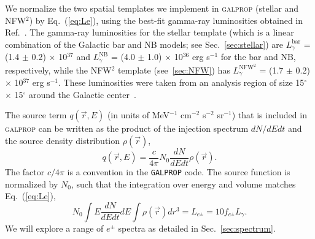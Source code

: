\documentclass[doublespace,nopageskip]{VTthesis} %
\begin{document}
We normalize the two spatial templates we implement in \textsc{galprop} (stellar and NFW$^2$) by Eq.~(\ref{eq:Le}), using the best-fit gamma-ray luminosities obtained in Ref.~\cite{2018NatAs...2..387M}. The gamma-ray luminosities for the stellar template (which is a linear combination of the Galactic bar and NB models; see Sec.~\ref{sec:stellar}) are $L^{\text{bar}}_\gamma$ = (1.4 $\pm$ 0.2) $\times$ 10$^{37}$ and $L^{\text{NB}}_\gamma$ = (4.0 $\pm$ 1.0) $\times$ 10$^{36}$ erg s$^{-1}$ for the bar and NB, respectively, while the NFW$^2$ template (see~\ref{sec:NFW}) has $L^{\text{NFW}^2}_\gamma$ = (1.7 $\pm$ 0.2) $\times$ 10$^{37}$ erg s$^{-1}$. These luminosities were taken from an analysis region of size 15$^\circ$ $\times$ 15$^\circ$ around the Galactic center~\cite{2018NatAs...2..387M}.

The source term $q(\vec{r},E)$ (in units of  MeV$^{-1}$ cm$^{-2}$ s$^{-2}$ sr$^{-1}$) that is included in \textsc{galprop} can be written as the product of the injection spectrum $dN/dEdt$ and the source density distribution $\rho(\vec{r})$,
\begin{equation}
  q(\vec{r},E) = \frac{c}{4\pi} N_0 \dfrac{dN}{dEdt}\rho(\vec{r}).
\end{equation}
The factor $c/4\pi$ is a convention in the {\tt GALPROP} code. The source function is normalized by $N_0$, such that the integration over energy and volume matches Eq.~(\ref{eq:Le}),
\begin{equation}
  \label{eq:normal}
  N_0 \int E\dfrac{dN}{dEdt}dE \int\rho(\vec{r})dr^3 = L_{e^\pm} = 10 f_{e^\pm} L_\gamma.
\end{equation}
We will explore a range of $e^\pm$ spectra as detailed in Sec.~\ref{sec:spectrum}.
\end{document}
